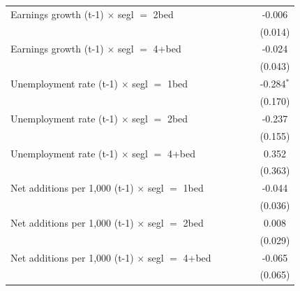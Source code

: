 \begin{table}[htbp]
\begin{tabular}{lccccc}
      Earnings growth (t-1) $\times$ segl $=$ 2bed           &               &               &              &         & -0.006\\   
                                                             &               &               &              &         & (0.014)\\   
      Earnings growth (t-1) $\times$ segl $=$ 4+bed          &               &               &              &         & -0.024\\   
                                                             &               &               &              &         & (0.043)\\   
      Unemployment rate (t-1) $\times$ segl $=$ 1bed         &               &               &              &         & -0.284$^{*}$\\   
                                                             &               &               &              &         & (0.170)\\   
      Unemployment rate (t-1) $\times$ segl $=$ 2bed         &               &               &              &         & -0.237\\   
                                                             &               &               &              &         & (0.155)\\   
      Unemployment rate (t-1) $\times$ segl $=$ 4+bed        &               &               &              &         & 0.352\\   
                                                             &               &               &              &         & (0.363)\\   
      Net additions per 1,000 (t-1) $\times$ segl $=$ 1bed   &               &               &              &         & -0.044\\   
                                                             &               &               &              &         & (0.036)\\   
      Net additions per 1,000 (t-1) $\times$ segl $=$ 2bed   &               &               &              &         & 0.008\\   
                                                             &               &               &              &         & (0.029)\\   
      Net additions per 1,000 (t-1) $\times$ segl $=$ 4+bed  &               &               &              &         & -0.065\\   
                                                             &               &               &              &         & (0.065)\\   

\end{tabular}
\end{table}
